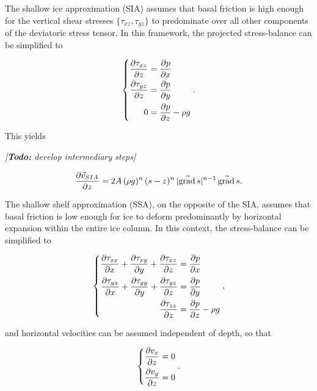 \documentclass{article}
\newcommand{\todo}[1]{\emph{[\textbf{Todo:} #1]}}
\renewcommand{\grad}[1]{\vec{\mathrm{grad}}\,#1}
\begin{document}
The shallow ice approximation (SIA) assumes that basal friction is high enough
for the vertical shear stresses $\{\tau_{xz}, \tau_{yz}\}$ to predominate over
all other components of the deviatoric stress tensor. In this framework, the
projected stress-balance can be simplified to

\begin{equation}
    \left\{\begin{aligned}
        \pdv{\tau_{xz}}{z} &= \pdv{p}{x} \\
        \pdv{\tau_{yz}}{z} &= \pdv{p}{y} \\
        0 &= \pdv{p}{z} - \rho g
    \end{aligned}\right..
\end{equation}

This yields

\todo{develop intermediary steps}

\begin{equation}
    \pdv{\vec{v}_{SIA}}{z} = 2A\,(\rho g)^n\,(s-z)^n\,
                             |\grad{s}|^{n-1}\,\grad{s}.
\end{equation}

The shallow shelf approximation (SSA), on the opposite of the SIA, assumes that
basal friction is low enough for ice to deform predominantly by horizontal
expansion within the entire ice column. In this context, the stress-balance can
be simplified to

\begin{equation}
    \left\{\begin{aligned}
        \pdv{\tau_{xx}}{x} + \pdv{\tau_{xy}}{y} + \pdv{\tau_{xz}}{z}
            &= \pdv{p}{x} \\
        \pdv{\tau_{yx}}{x} + \pdv{\tau_{yy}}{y} + \pdv{\tau_{yz}}{z}
            &= \pdv{p}{y} \\
        \pdv{\tau_{zz}}{z} &= \pdv{p}{z} - \rho g
    \end{aligned}\right.,
\end{equation}

and horizontal velocities can be assumed independent of depth, so that

\begin{equation}
    \left\{\begin{aligned}
        \pdv{v_x}{z} &= 0 \\
        \pdv{v_y}{z} &= 0 \\
    \end{aligned}\right..
\end{equation}
\end{document}
